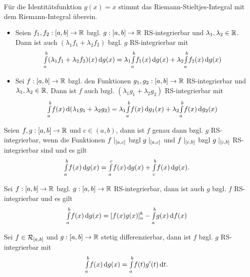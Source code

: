 \documentclass{cheat-sheet}
\begin{document}
\begin{bem}
  Für die Identitätsfunktion $g(x) = x$ stimmt das Riemann-Stieltjes-Integral mit dem Riemann-Integral überein.
\end{bem}


\begin{satz}
  \begin{itemize}
    \item Seien $f_1, f_2 : \left[ a, b \right] \to \mathbb{R}$ bzgl. $g : \left[ a, b \right] \to \mathbb{R}$ RS-integrierbar und $\lambda_1, \lambda_2 \in \mathbb{R}$. Dann ist auch $(\lambda_1 f_1 + \lambda_2 f_2)$ bzgl. $g$ RS-integrierbar mit
    \[ {\textstyle \int\limits_{a}^{b}} (\lambda_1 f_1 + \lambda_2 f_2)(x) \,\mathrm{d} g(x) = \lambda_1 {\textstyle \int\limits_{a}^{b}} f_1(x) \,\mathrm{d} g(x) + \lambda_2 {\textstyle \int\limits_{a}^{b}} f_2(x) \,\mathrm{d} g(x) \]
    \item Sei $f : \left[ a, b \right] \to \mathbb{R}$ bzgl. den Funktionen $g_1, g_2 : \left[ a, b \right] \to \mathbb{R}$ RS-integrierbar und $\lambda_1, \lambda_2 \in \mathbb{R}$. Dann ist $f$ auch bzgl. $(\lambda_1 g_1 + \lambda_2 g_2)$ RS-integrierbar mit
    \[ {\textstyle \int\limits_{a}^{b}} f(x) \,\mathrm{d} (\lambda_1 g_1 + \lambda_2 g_2) = \lambda_1 {\textstyle \int\limits_{a}^{b}} f(x) \,\mathrm{d} g_1(x) + \lambda_2 {\textstyle \int\limits_{a}^{b}} f(x) \,\mathrm{d} g_2(x) \]
  \end{itemize}
\end{satz}

\begin{satz}
  Seien $f, g : \left[ a, b \right] \to \mathbb{R}$ und $c \in (a, b)$, dann ist $f$ genau dann bzgl. $g$ RS-integrierbar, wenn die Funktionen $f\mid_{\left[ a, c \right]}$ bzgl $g\mid_{\left[ a, c \right]}$ und $f\mid_{\left[ c, b \right]}$ bzgl $g\mid_{\left[ c, b \right]}$ RS-integrierbar sind und es gilt
  \[ {\textstyle \int\limits_{a}^{b}} f(x) \,\mathrm{d} g(x) = {\textstyle \int\limits_{a}^{c}} f(x) \,\mathrm{d} g(x) + {\textstyle \int\limits_{c}^{b}} f(x) \,\mathrm{d} g(x). \]
\end{satz}

\begin{satz}
  Sei $f : \left[ a, b \right] \to \mathbb{R}$ bzgl. $g : \left[ a, b \right] \to \mathbb{R}$ RS-integrierbar, dann ist auch $g$ bzgl. $f$ RS-integrierbar und es gilt
  \[ {\textstyle \int\limits_{a}^{b}} f(x) \,\mathrm{d} g(x) = [f(x)g(x)]_a^b - {\textstyle \int\limits_{a}^{b}} g(x) \,\mathrm{d} f(x) \]
\end{satz}

\begin{satz}
  Sei $f \in \mathcal{R}_{\left[ a, b \right]}$ und $g : \left[ a, b \right] \to \mathbb{R}$ stetig differenzierbar, dann ist $f$ bzgl. $g$ RS-integrierbar mit
  \[ {\textstyle \int\limits_{a}^{b}} f(x) \,\mathrm{d} g(x) = {\textstyle \int\limits_{a}^{b}} f(t)g'(t) \,\mathrm{d} t. \]
\end{satz}
\end{document}
